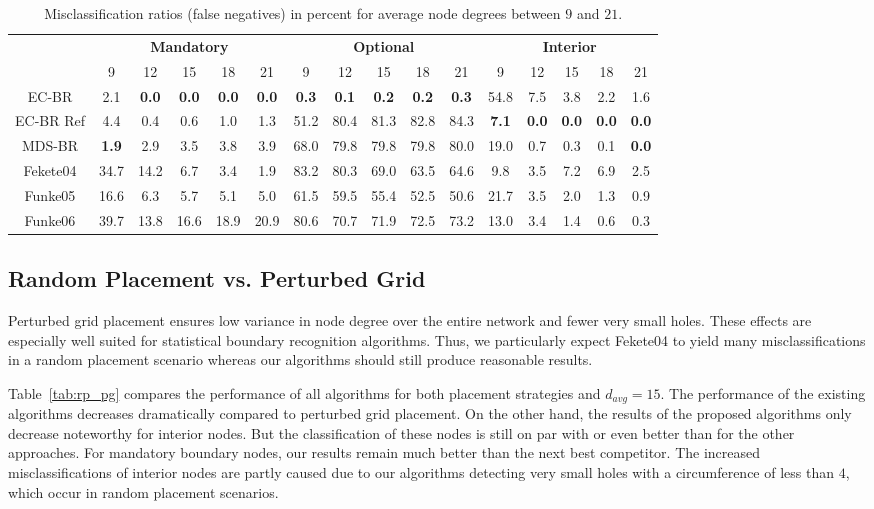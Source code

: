 \documentclass{llncs}
\begin{document}
\begin{table}[t]
\setlength\tabcolsep{5pt}
\centering
\caption{Misclassification ratios (false negatives) in percent for average node degrees between $9$ and $21$.}\label{tab:net_density}
\begin{tabular}{c||ccccc||ccccc||ccccc}
& \multicolumn{5}{c||}{\bfseries Mandatory}& \multicolumn{5}{c||}{\bfseries Optional}& \multicolumn{5}{c}{\bfseries Interior} \\
 & 9 & 12 & 15 & 18 & 21 & 9 & 12 & 15 & 18 & 21 & 9 & 12 & 15 & 18 & 21 \\
\hline
EC-BR & 2.1 & \bfseries 0.0 & \bfseries 0.0 & \bfseries 0.0 & \bfseries 0.0 & \bfseries 0.3 & \bfseries 0.1 & \bfseries 0.2 & \bfseries 0.2 & \bfseries 0.3 & 54.8 & 7.5 & 3.8 & 2.2 & 1.6  \\
EC-BR Ref & 4.4 & 0.4 & 0.6 & 1.0 & 1.3 & 51.2 & 80.4 & 81.3 & 82.8 & 84.3 & \bfseries 7.1 & \bfseries 0.0 & \bfseries 0.0 & \bfseries 0.0 & \bfseries 0.0  \\

MDS-BR & \bfseries 1.9 & 2.9 & 3.5 & 3.8 & 3.9 & 68.0 & 79.8 & 79.8 & 79.8 & 80.0 & 19.0 & 0.7 & 0.3 & 0.1 & \bfseries 0.0  \\
\hline
Fekete04 & 34.7 & 14.2 & 6.7 & 3.4 & 1.9 & 83.2 & 80.3 & 69.0 & 63.5 & 64.6 & 9.8 & 3.5 & 7.2 & 6.9 & 2.5 \\
Funke05 & 16.6 & 6.3 & 5.7 & 5.1 & 5.0 & 61.5 & 59.5 & 55.4 & 52.5 & 50.6 & 21.7 & 3.5 & 2.0 & 1.3 & 0.9  \\
Funke06 & 39.7 & 13.8 & 16.6 & 18.9 & 20.9 & 80.6 & 70.7 & 71.9 & 72.5 & 73.2 & 13.0 & 3.4 & 1.4 & 0.6 & 0.3
\end{tabular}
\end{table}


\subsection{Random Placement vs. Perturbed Grid}
Perturbed grid placement ensures low variance in node degree over the entire network and fewer very small holes.
These effects are especially well suited for statistical boundary recognition algorithms.
Thus, we particularly expect Fekete04 to yield many misclassifications in a random placement scenario whereas our algorithms should still produce reasonable results.

Table~\ref{tab:rp_pg} compares the performance of all algorithms for both placement strategies and $d_{avg} = 15$.
The performance of the existing algorithms decreases dramatically compared to perturbed grid placement.
On the other hand, the results of the proposed algorithms only decrease noteworthy for interior nodes.
But the classification of these nodes is still on par with or even better than for the other approaches.
For mandatory boundary nodes, our results remain much better than the next best competitor.
The increased misclassifications of interior nodes are partly caused due to our algorithms detecting very small holes with a circumference of less than $4$, which occur in random placement scenarios.
\end{document}
